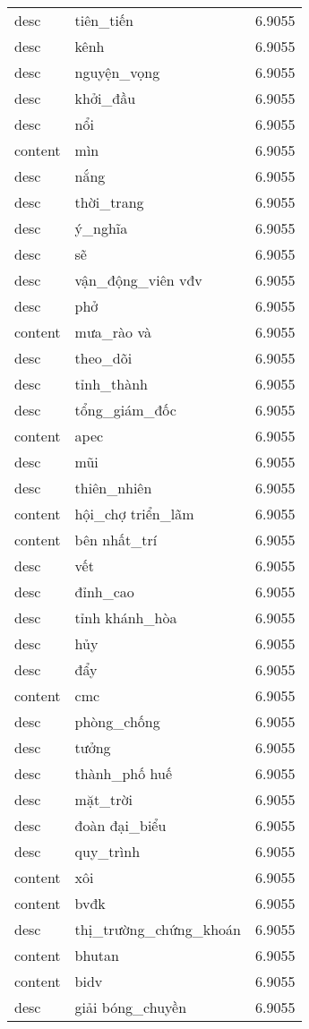 \documentclass{article}
\begin{document}
\begin{tabular}{lll}
desc & tiên\_tiến & 6.9055\\
desc & kênh & 6.9055\\
desc & nguyện\_vọng & 6.9055\\
desc & khởi\_đầu & 6.9055\\
desc & nổi & 6.9055\\
content & mìn & 6.9055\\
desc & nắng & 6.9055\\
desc & thời\_trang & 6.9055\\
desc & ý\_nghĩa & 6.9055\\
desc & sẽ & 6.9055\\
desc & vận\_động\_viên vđv & 6.9055\\
desc & phở & 6.9055\\
content & mưa\_rào và & 6.9055\\
desc & theo\_dõi & 6.9055\\
desc & tỉnh\_thành & 6.9055\\
desc & tổng\_giám\_đốc & 6.9055\\
content & apec & 6.9055\\
desc & mũi & 6.9055\\
desc & thiên\_nhiên & 6.9055\\
content & hội\_chợ triển\_lãm & 6.9055\\
content & bên nhất\_trí & 6.9055\\
desc & vết & 6.9055\\
desc & đỉnh\_cao & 6.9055\\
desc & tỉnh khánh\_hòa & 6.9055\\
desc & hủy & 6.9055\\
desc & đẩy & 6.9055\\
content & cmc & 6.9055\\
desc & phòng\_chống & 6.9055\\
desc & tưởng & 6.9055\\
desc & thành\_phố huế & 6.9055\\
desc & mặt\_trời & 6.9055\\
desc & đoàn đại\_biểu & 6.9055\\
desc & quy\_trình & 6.9055\\
content & xôi & 6.9055\\
content & bvđk & 6.9055\\
desc & thị\_trường\_chứng\_khoán & 6.9055\\
content & bhutan & 6.9055\\
content & bidv & 6.9055\\
desc & giải bóng\_chuyền & 6.9055\\

\end{tabular}
\end{document}
